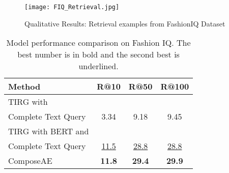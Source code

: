\begin{figure*}
\centering
\texttt{[image: FIQ\_Retrieval.jpg]}
\caption{Qualitative Results: Retrieval examples from FashionIQ Dataset}
\label{fig:fIQqual}
\end{figure*}


\begin{table}[ht]

\centering
\begin{tabular}{|l|ccc|}
\hline
Method & R@10 & R@50 & R@100 \\
\hline\hline
TIRG with &  &  & \\ Complete Text Query & 3.34  & 9.18  &  9.45 \\
\hline
TIRG with BERT and &  &  & \\ Complete Text Query & \underline{11.5} & \underline{28.8} & \underline{28.8}
\\
\hline
ComposeAE & \textbf{11.8} & \textbf{29.4} & \textbf{29.9} \\

\hline
\end{tabular}

\label{tab:fiq}
\vspace{3mm}
\caption{Model performance comparison on Fashion IQ. The best number is in bold and the second best is underlined.}
\end{table}








%
